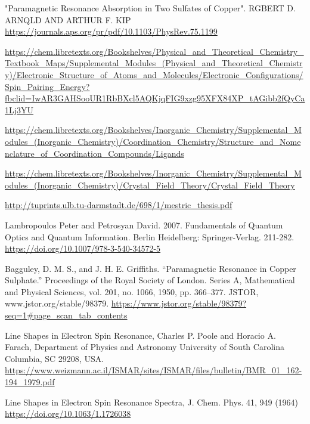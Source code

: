 \documentclass[openany,11pt,a4paper]{report}
\begin{document}
\begin{thebibliography}{99}

  "Paramagnetic Resonance Absorption in Two Sulfates of Copper".
RGBERT D. ARNQLD AND ARTHUR F. KIP \url{https://journals.aps.org/pr/pdf/10.1103/PhysRev.75.1199}

 \url{https://chem.libretexts.org/Bookshelves/Physical_and_Theoretical_Chemistry_Textbook_Maps/Supplemental_Modules_(Physical_and_Theoretical_Chemistry)/Electronic_Structure_of_Atoms_and_Molecules/Electronic_Configurations/Spin_Pairing_Energy?fbclid=IwAR3GAHSooUR1RbBXcl5AQKjqFIG9xzg95XFX84XP_tAGibb2fQyCa1Lj3YU}

 \url{https://chem.libretexts.org/Bookshelves/Inorganic_Chemistry/Supplemental_Modules_(Inorganic_Chemistry)/Coordination_Chemistry/Structure_and_Nomenclature_of_Coordination_Compounds/Ligands}



 \url{https://chem.libretexts.org/Bookshelves/Inorganic_Chemistry/Supplemental_Modules_(Inorganic_Chemistry)/Crystal_Field_Theory/Crystal_Field_Theory}





 \url{http://tuprints.ulb.tu-darmstadt.de/698/1/mestric_thesis.pdf}



 Lambropoulos Peter and Petrosyan David. 2007. Fundamentals of Quantum Optics and Quantum Information.  Berlin Heidelberg: Springer-Verlag. 211-282.\\
\url{https://doi.org/10.1007/978-3-540-34572-5}


Bagguley, D. M. S., and J. H. E. Griffiths. “Paramagnetic Resonance in Copper Sulphate.” Proceedings of the Royal Society of London. Series A, Mathematical and Physical Sciences, vol. 201, no. 1066, 1950, pp. 366–377. JSTOR, www.jstor.org/stable/98379. 
\url{https://www.jstor.org/stable/98379?seq=1#page_scan_tab_contents}


 Line Shapes in Electron Spin Resonance, Charles P. Poole and Horacio A. Farach, Department of Physics and Astronomy
University of South Carolina
Columbia, SC 29208, USA.  \url{https://www.weizmann.ac.il/ISMAR/sites/ISMAR/files/bulletin/BMR_01_162-194_1979.pdf}

 Line Shapes in Electron Spin Resonance Spectra,
J. Chem. Phys. 41, 949 (1964)
\url{ https://doi.org/10.1063/1.1726038}


\end{thebibliography}
\end{document}
